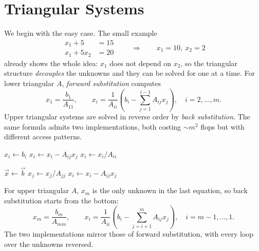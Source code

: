 \section{Triangular Systems}

We begin with the easy case. The small example
\begin{equation}
  \begin{aligned} x_1 + 5 &= 15 \\ x_1 + 5x_2 &= 20 \end{aligned} \qquad\Longrightarrow\qquad x_1 = 10,\ x_2 = 2
\end{equation}
already shows the whole idea: $x_1$ does not depend on $x_2$, so the triangular structure \emph{decouples} the unknowns and they can be solved for one at a time. For lower triangular $A$, \emph{forward substitution} computes
\begin{equation}
  x_1 = \frac{b_1}{A_{11}}, \qquad x_i = \frac{1}{A_{ii}}\left(b_i - \sum_{j=1}^{i-1} A_{ij}x_j\right), \quad i = 2, \dots, m.
\end{equation}
Upper triangular systems are solved in reverse order by \emph{back substitution}. The same formula admits two implementations, both costing $\sim m^2$ flops but with different access patterns.

\begin{algorithm}[H]
  \caption{Forward substitution, row-oriented (\texttt{dot} form).}
  \begin{algorithmic}[1]
      \State $x_i \gets b_i$
        \State $x_i \gets x_i - A_{ij}x_j$
      \EndFor
      \State $x_i \gets x_i / A_{ii}$
    \EndFor
  \end{algorithmic}
\end{algorithm}

\begin{algorithm}[H]
  \caption{Forward substitution, column-oriented (\texttt{axpy} form), the efficient variant.}
  \begin{algorithmic}[1]
    \State $\vec{x} \gets \vec{b}$
      \State $x_j \gets x_j / A_{jj}$
        \State $x_i \gets x_i - A_{ij}x_j$ 
      \EndFor
    \EndFor
  \end{algorithmic}
\end{algorithm}

For upper triangular $A$, $x_m$ is the only unknown in the last equation, so back substitution starts from the bottom:
\begin{equation}
  x_m = \frac{b_m}{A_{mm}}, \qquad x_i = \frac{1}{A_{ii}}\left(b_i - \sum_{j=i+1}^{m} A_{ij}x_j\right), \quad i = m - 1, \dots, 1.
\end{equation}
The two implementations mirror those of forward substitution, with every loop over the unknowns reversed.

